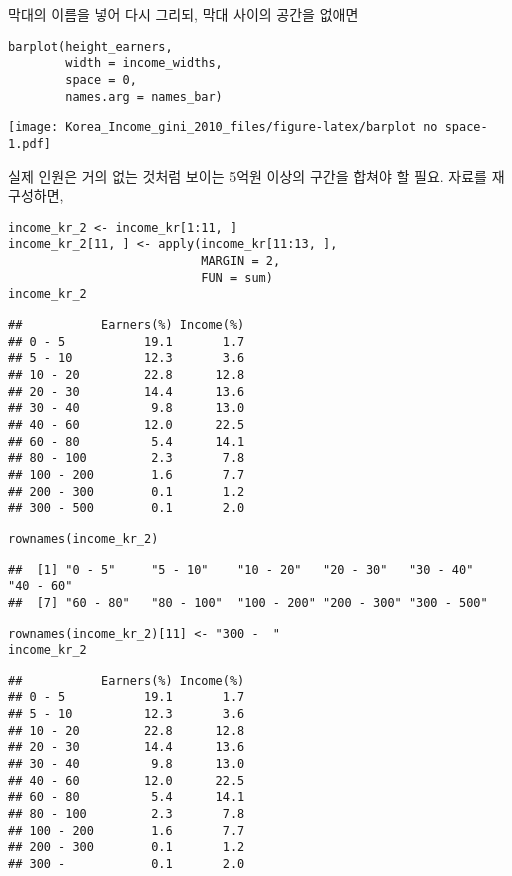 \documentclass[
]{article}
\begin{document}
막대의 이름을 넣어 다시 그리되, 막대 사이의 공간을 없애면

\begin{verbatim}
barplot(height_earners, 
        width = income_widths, 
        space = 0, 
        names.arg = names_bar)
\end{verbatim}

\texttt{[image: Korea\_Income\_gini\_2010\_files/figure-latex/barplot no space-1.pdf]}

실제 인원은 거의 없는 것처럼 보이는 5억원 이상의 구간을 합쳐야 할 필요.
자료를 재구성하면,

\begin{verbatim}
income_kr_2 <- income_kr[1:11, ]
income_kr_2[11, ] <- apply(income_kr[11:13, ], 
                           MARGIN = 2, 
                           FUN = sum)
income_kr_2
\end{verbatim}

\begin{verbatim}
##           Earners(%) Income(%)
## 0 - 5           19.1       1.7
## 5 - 10          12.3       3.6
## 10 - 20         22.8      12.8
## 20 - 30         14.4      13.6
## 30 - 40          9.8      13.0
## 40 - 60         12.0      22.5
## 60 - 80          5.4      14.1
## 80 - 100         2.3       7.8
## 100 - 200        1.6       7.7
## 200 - 300        0.1       1.2
## 300 - 500        0.1       2.0
\end{verbatim}

\begin{verbatim}
rownames(income_kr_2)
\end{verbatim}

\begin{verbatim}
##  [1] "0 - 5"     "5 - 10"    "10 - 20"   "20 - 30"   "30 - 40"   "40 - 60"  
##  [7] "60 - 80"   "80 - 100"  "100 - 200" "200 - 300" "300 - 500"
\end{verbatim}

\begin{verbatim}
rownames(income_kr_2)[11] <- "300 -  "
income_kr_2
\end{verbatim}

\begin{verbatim}
##           Earners(%) Income(%)
## 0 - 5           19.1       1.7
## 5 - 10          12.3       3.6
## 10 - 20         22.8      12.8
## 20 - 30         14.4      13.6
## 30 - 40          9.8      13.0
## 40 - 60         12.0      22.5
## 60 - 80          5.4      14.1
## 80 - 100         2.3       7.8
## 100 - 200        1.6       7.7
## 200 - 300        0.1       1.2
## 300 -            0.1       2.0
\end{verbatim}
\end{document}
